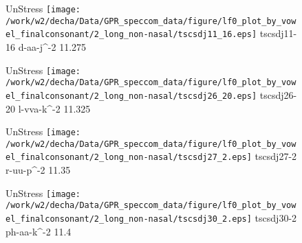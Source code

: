 \documentclass{article}
\begin{document}
\begin{figure}[t]
\begin{minipage}[b]{.24\textwidth}
UnStress
\centering
\texttt{[image: /work/w2/decha/Data/GPR\_speccom\_data/figure/lf0\_plot\_by\_vowel\_finalconsonant/2\_long\_non-nasal/tscsdj11\_16.eps]}
tscsdj11-16 d-aa-j\textasciicircum-2 11.275
\end{minipage}
\begin{minipage}[b]{.24\textwidth}
UnStress
\centering
\texttt{[image: /work/w2/decha/Data/GPR\_speccom\_data/figure/lf0\_plot\_by\_vowel\_finalconsonant/2\_long\_non-nasal/tscsdj26\_20.eps]}
tscsdj26-20 l-vva-k\textasciicircum-2 11.325
\end{minipage}
\begin{minipage}[b]{.24\textwidth}
UnStress
\centering
\texttt{[image: /work/w2/decha/Data/GPR\_speccom\_data/figure/lf0\_plot\_by\_vowel\_finalconsonant/2\_long\_non-nasal/tscsdj27\_2.eps]}
tscsdj27-2 r-uu-p\textasciicircum-2 11.35
\end{minipage}
\begin{minipage}[b]{.24\textwidth}
UnStress
\centering
\texttt{[image: /work/w2/decha/Data/GPR\_speccom\_data/figure/lf0\_plot\_by\_vowel\_finalconsonant/2\_long\_non-nasal/tscsdj30\_2.eps]}
tscsdj30-2 ph-aa-k\textasciicircum-2 11.4
\end{minipage}
\end{figure}
\end{document}
